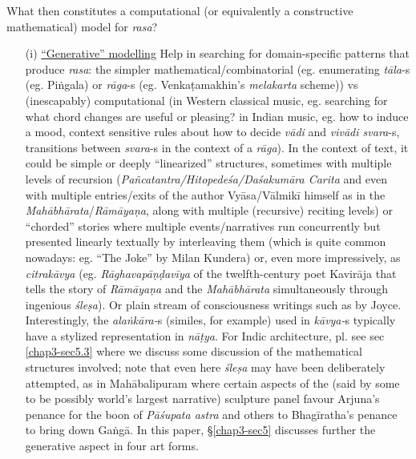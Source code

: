What then constitutes a computational (or equivalently a constructive mathematical) model for \textsl{rasa}?
\begin{itemize}
\item[(i)] \underline{“Generative” modelling} Help in searching for domain-specific patterns that produce \textsl{rasa}: the simpler mathematical/combi\-natorial (eg. enumerating \textsl{tāla}-s (eg. Piṅgala) or \textsl{rāga}-s (eg. Venkaṭamakhin's \textsl{melakarta} scheme)) vs (inescapably) computational (in Western classical music, eg. searching for what chord changes are useful or pleasing? in Indian music, eg. how to induce a mood, context sensitive rules about how to decide \textsl{vādi} and \textsl{vivādi svara}-s, transitions between \textsl{svara}-s in the context of a \textsl{rāga}). In the context of text, it could be simple or deeply “linearized” structures, sometimes with multiple levels of recursion (\textsl{Pañcatantra/Hitopedeśa/Daśakumāra Carita} and even with multiple entries/exits of the author Vyāsa/Vālmikī himself as in the \textsl{Mahābhārata}/\textsl{Rāmāyaṇa}, along with multiple (recursive) reciting levels) or “chorded” stories where multiple events/narratives run concurrently but presented linearly textually by interleaving them (which is quite common nowadays: eg. “The Joke” by Milan Kundera) or, even more impressively, as \textsl{citrakāvya} (eg. \textsl{Rāghavapāṇḍavīya} of the twelfth-century poet Kavirāja that tells the story of \textsl{Rāmāyaṇa} and the \textsl{Mahābhārata} simultaneously through ingenious \textsl{śleṣa}). Or plain stream of consciousness writings such as by Joyce. Interestingly, the \textsl{alaṅkāra-}s (similes, for example) used in \textsl{kāvya-}s typically have a stylized representation in \textsl{nāṭya}. For Indic architecture, pl. see sec \ref{chap3-sec5.3} where we discuss some discussion of the mathematical structures involved; note that even here \textsl{śleṣa} may have been deliberately attempted, as in Mahābalipuram where certain aspects of the (said by some to be possibly world's largest narrative) sculpture panel favour Arjuna’s penance for the boon of \textsl{Pāśupata astra} and others to Bhagīratha’s penance to bring down Gaṅgā. In this paper, \S\ref{chap3-sec5} discusses further the generative aspect in four art forms.


\end{itemize}
